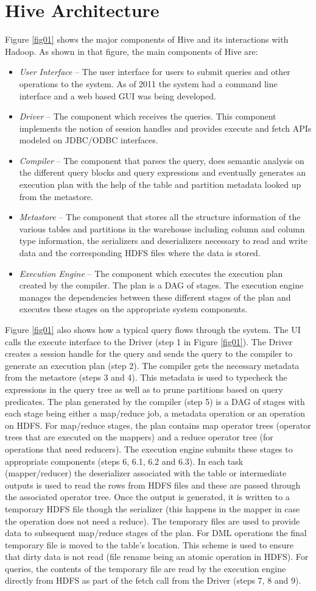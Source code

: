 \documentclass[twocolumn]{article}
\newcommand{\bi}{\begin{itemize}}
\newcommand{\ei}{\end{itemize}}
\newcommand{\ii}{\item}
\begin{document}
\section{Hive Architecture}
Figure \ref{fig01} shows the major components of Hive and its interactions with Hadoop. As shown in that figure, the main components of Hive are:
\bi
\ii \textit{User Interface} – The user interface for users to submit queries and other operations to the system. As of 2011 the system had a command line interface and a web based GUI was being developed.
\ii \textit{Driver} – The component which receives the queries. This component implements the notion of session handles and provides execute and fetch APIs modeled on JDBC/ODBC interfaces.
\ii \textit{Compiler} – The component that parses the query, does semantic analysis on the different query blocks and query expressions and eventually generates an execution plan with the help of the table and partition metadata looked up from the metastore.
\ii \textit{Metastore} – The component that stores all the structure information of the various tables and partitions in the warehouse including column and column type information, the serializers and deserializers necessary to read and write data and the corresponding HDFS files where the data is stored.
\ii \textit{Execution Engine} – The component which executes the execution plan created by the compiler. The plan is a DAG of stages. The execution engine manages the dependencies between these different stages of the plan and executes these stages on the appropriate system components.
\ei
Figure \ref{fig01} also shows how a typical query flows through the system. The UI calls the execute interface to the Driver (step 1 in Figure \ref{fig01}). 
The Driver creates a session handle for the query and sends the query to the compiler to generate an execution plan (step 2). 
The compiler gets the necessary metadata from the metastore (steps 3 and 4). 
This metadata is used to typecheck the expressions in the query tree as well as to prune partitions based on query predicates. 
The plan generated by the compiler (step 5) is a DAG of stages with each stage being either a map/reduce job, a metadata operation or an operation on HDFS. For map/reduce stages, the plan contains map operator trees (operator trees that are executed on the mappers) and a reduce operator tree (for operations that need reducers). 
The execution engine submits these stages to appropriate components (steps 6, 6.1, 6.2 and 6.3). 
In each task (mapper/reducer) the deserializer associated with the table or intermediate outputs is used to read the rows from HDFS files and these are passed through the associated operator tree. Once the output is generated, it is written to a temporary HDFS file though the serializer (this happens in the mapper in case the operation does not need a reduce). 
The temporary files are used to provide data to subsequent map/reduce stages of the plan. For DML operations the final temporary file is moved to the table's location. 
This scheme is used to ensure that dirty data is not read (file rename being an atomic operation in HDFS). For queries, the contents of the temporary file are read by the execution engine directly from HDFS as part of the fetch call from the Driver (steps 7, 8 and 9).
\end{document}
